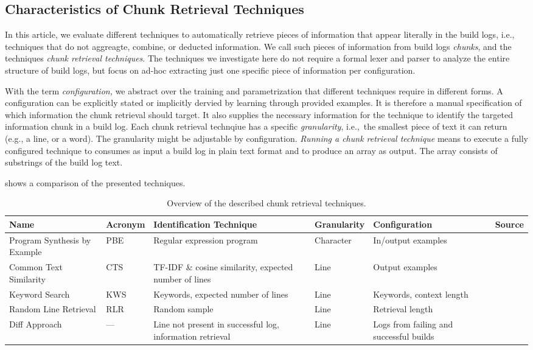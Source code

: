 \subsection{Characteristics of Chunk Retrieval Techniques}
\label{sec:blirt}
In this article, we evaluate different techniques to automatically
retrieve pieces of information that appear literally in the build
logs, i.e., techniques that do not aggreagte, combine, or deducted
information. We call such pieces of information from build logs
\emph{chunks}, and the techniques \emph{chunk retrieval techniques}.
The techniques we investigate here do not require a formal lexer and
parser to analyze the entire structure of build logs, but focus on
ad-hoc extracting just one specific piece of information per
configuration.

With the term \textit{configuration,} we abstract over the training
and parametrization that different techniques require in different
forms. A configuration can be explicitly stated or implicitly dervied
by learning through provided examples. It is therefore a manual
specification of which information the chunk retrieval should target.
It also supplies the necessary information for the technique to
identify the targeted information chunk in a build log. Each chunk
retrieval technqiue has a specific \textit{granularity}, i.e.,\ the
smallest piece of text it can return (e.g., a line, or a word). The
granularity might be adjustable by configuration. \emph{Running a
chunk retrieval technique} means to execute a fully configured
technique to consumes as input a build log in plain text format and to
produce an array as output. The array consists of substrings of the
build log text.

 shows a comparison of the presented techniques.

\begin{table}[]
\centering
\caption{Overview of the described chunk retrieval techniques.}
\begin{tabularx}{\textwidth}{@{}XlXlXX@{}} 
\toprule
Name                         & Acronym & Identification Technique                                   & Granularity & Configuration & Source            \\ 
\midrule
Program Synthesis by Example & PBE     & Regular expression program                                 & Character   & In/output examples      \\
Common Text Similarity       & CTS     & TF-IDF \& cosine similarity, expected number of lines & Line        & Output examples           \\
Keyword Search               & KWS     & Keywords, expected number of lines                    & Line        & Keywords, context length  \\
Random Line Retrieval        & RLR     & Random sample                                              & Line        & Retrieval length          \\
Diff Approach                & ---     & Line not present in successful log, information retrieval  & Line        & Logs from failing and successful builds      \\
\bottomrule
\end{tabularx}
\label{tab:ctr}
\end{table}


